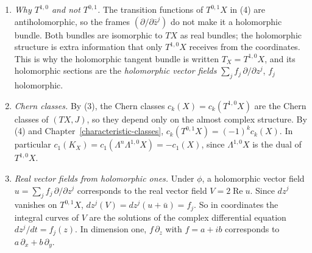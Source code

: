 \begin{remark}\label{holomorphic-bundles:remark-holomorphic-tangent}
\begin{enumerate}
\item \emph{Why $T^{1,0}$ and not $T^{0,1}$.} The transition functions of $T^{0,1}X$ in (4) are antiholomorphic, so the frames $(\partial/\partial\bar z^j)$ do not make it a holomorphic bundle. Both bundles are
isomorphic to $TX$ as real bundles; the holomorphic structure is extra information that only $T^{1,0}X$ receives from the coordinates. This is why the holomorphic tangent bundle is written $T_X = T^{1,0}X$,
and its holomorphic sections are the \emph{holomorphic vector fields} $\sum_jf_j\,\partial/\partial z^j$, $f_j$ holomorphic.
\item \emph{Chern classes.} By (3), the Chern classes $c_k(X) = c_k(T^{1,0}X)$ are the Chern classes of $(TX, J)$, so they depend only on the almost complex structure. By (4) and Chapter~\ref{characteristic-classes},
$c_k(T^{0,1}X) = (-1)^kc_k(X)$. In particular $c_1(K_X) = c_1(\Lambda^n\Lambda^{1,0}X) = -c_1(X)$, since $\Lambda^{1,0}X$ is the dual of $T^{1,0}X$.
\item \emph{Real vector fields from holomorphic ones.} Under $\phi$, a holomorphic vector field $u = \sum_jf_j\,\partial/\partial z^j$ corresponds to the real vector field $V = 2\operatorname{Re}u$. Since $dz^j$ vanishes on
$T^{0,1}X$, $dz^j(V) = dz^j(u + \bar u) = f_j$. So in coordinates the integral curves of $V$ are the solutions of the complex differential equation $dz^j/dt = f_j(z)$. In dimension one, $f\,\partial_z$ with $f = a + ib$
corresponds to $a\,\partial_x + b\,\partial_y$.
\end{enumerate}
\end{remark}

